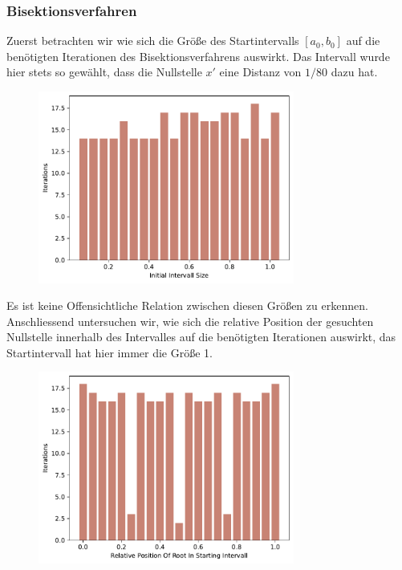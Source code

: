 \documentclass[a4paper,12pt]{article}
\newcommand{\1}{1\hspace{-0,9ex}1}
\begin{document}
\subsubsection*{Bisektionsverfahren}
Zuerst betrachten wir wie sich die Größe des Startintervalls $[a_0, b_0]$ auf die benötigten Iterationen des Bisektionsverfahrens auswirkt. Das Intervall wurde hier stets so gewählt, dass die Nullstelle $x'$ eine Distanz von $1/80$ dazu hat.

\begin{figure}[H]
	\centering
	\includegraphics[width=0.75\textwidth]{plots/bisection_iterations_by_intervall_size.pdf}
\end{figure}

Es ist keine Offensichtliche Relation zwischen diesen Größen zu erkennen. Anschliessend untersuchen wir, wie sich die relative Position der gesuchten Nullstelle innerhalb des Intervalles auf die benötigten Iterationen auswirkt, das Startintervall hat hier immer die Größe 1.

\begin{figure}[H]
	\centering
	\includegraphics[width=0.75\textwidth]{plots/bisection_iterations_by_relative_position_of_root.pdf}
\end{figure}
\end{document}

